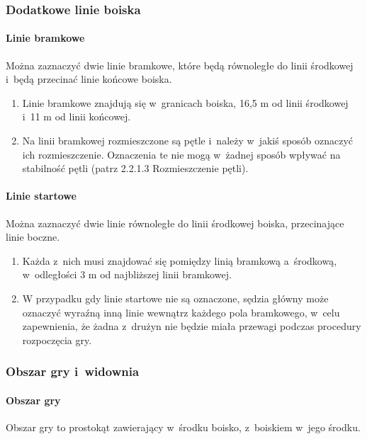 \documentclass[12pt,a4paper]{article}
\begin{document}
\subsubsection{Dodatkowe linie boiska}

\paragraph{Linie bramkowe}
Można zaznaczyć dwie linie
bramkowe, które będą równoległe do linii środkowej i~będą przecinać
linie końcowe boiska.

\begin{enumerate}
	\item Linie bramkowe znajdują się w~granicach boiska, 16,5 m od linii
	      środkowej i~11 m od linii końcowej.

	\item Na linii bramkowej rozmieszczone są pętle i~należy w~jakiś sposób
	      oznaczyć ich rozmieszczenie. Oznaczenia te nie mogą w~żadnej sposób
	      wpływać na stabilność pętli (patrz 2.2.1.3 Rozmieszczenie pętli).
\end{enumerate}

\paragraph{Linie startowe}
Można zaznaczyć dwie linie równoległe
do linii środkowej boiska, przecinające linie boczne.

\begin{enumerate}
	\item Każda z~nich musi znajdować się pomiędzy linią bramkową a~środkową, w~odległości 3 m od najbliższej linii bramkowej.
	\item W przypadku gdy linie startowe nie są oznaczone, sędzia główny może
	      oznaczyć wyraźną inną linie wewnątrz każdego pola bramkowego, w~celu
	      zapewnienia, że żadna z~drużyn nie będzie miała przewagi podczas
	      procedury rozpoczęcia gry.
\end{enumerate}

\subsubsection{Obszar gry i~widownia}

\paragraph{Obszar gry}
Obszar gry to prostokąt zawierający w~środku boisko, z~boiskiem w~jego środku.
\end{document}
